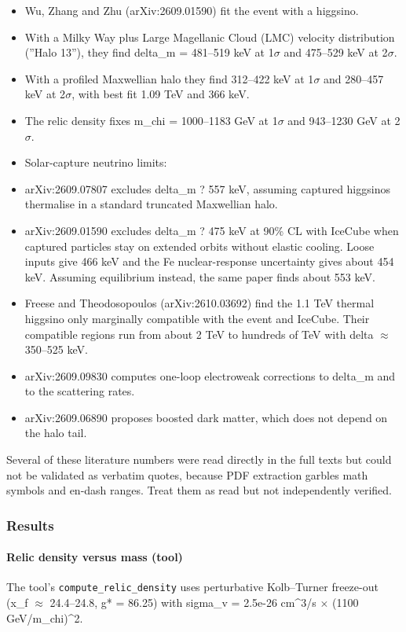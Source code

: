 \documentclass[11pt,a4paper]{article}
\begin{document}
\begin{itemize}
  \item Wu, Zhang and Zhu (arXiv:2609.01590) fit the event with a higgsino.
  \item With a Milky Way plus Large Magellanic Cloud (LMC) velocity distribution (''Halo 13''), they find delta\_m = 481--519 keV at 1$\sigma$ and 475--529 keV at 2$\sigma$.
  \item With a profiled Maxwellian halo they find 312--422 keV at 1$\sigma$ and 280--457 keV at 2$\sigma$, with best fit 1.09 TeV and 366 keV.
  \item The relic density fixes m\_chi = 1000--1183 GeV at 1$\sigma$ and 943--1230 GeV at 2$\sigma$.
  \item Solar-capture neutrino limits:
  \item arXiv:2609.07807 excludes delta\_m ? 557 keV, assuming captured higgsinos thermalise in a standard truncated Maxwellian halo.
  \item arXiv:2609.01590 excludes delta\_m ? 475 keV at 90\% CL with IceCube when captured particles stay on extended orbits without elastic cooling. Loose inputs give 466 keV and the Fe nuclear-response uncertainty gives about 454 keV. Assuming equilibrium instead, the same paper finds about 553 keV.
  \item Freese and Theodosopoulos (arXiv:2610.03692) find the 1.1 TeV thermal higgsino only marginally compatible with the event and IceCube. Their compatible regions run from about 2 TeV to hundreds of TeV with delta $\approx$ 350--525 keV.
  \item arXiv:2609.09830 computes one-loop electroweak corrections to delta\_m and to the scattering rates.
  \item arXiv:2609.06890 proposes boosted dark matter, which does not depend on the halo tail.
\end{itemize}
Several of these literature numbers were read directly in the full texts but could not be validated as verbatim quotes, because PDF extraction garbles math symbols and en-dash ranges. Treat them as read but not independently verified.

\subsubsection*{Results}
\paragraph{Relic density versus mass (tool)}
The tool's \texttt{compute\_\allowbreak{}relic\_\allowbreak{}density} uses perturbative Kolb--Turner freeze-out (x\_f $\approx$ 24.4--24.8, g* = 86.25) with sigma\_v = 2.5e-26 cm\textasciicircum{}3/s $\times$ (1100 GeV/m\_chi)\textasciicircum{}2.
\end{document}
